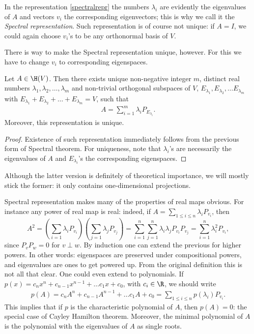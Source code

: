 In the representation \ref{spectralrepr} the numbers $\lambda_{i}$ are evidently the eigenvalues of $A$ and vectors $v_{i}$ the corresponding eigenvectors; this is why we call it the \textit{Spectral representation}. Such representation is of course not unique: if $A = I$, we could again choose $v_{i}$'s to be any orthonormal basis of $V$.

There is way to make the Spectral representation unique, however. For this we have to change $v_{i}$ to corresponding eigenspaces.

\begin{lause}
	Let $A \in \H(V)$. Then there exists unique non-negative integer $m$, distinct real numbers $\lambda_{1}, \lambda_{2}, \ldots, \lambda_{m}$ and non-trivial orthogonal subspaces of $V$, $E_{\lambda_{1}}, E_{\lambda_{2}}, \ldots E_{\lambda_{m}}$ with $E_{\lambda_{1}} + E_{\lambda_{2}} + \ldots + E_{\lambda_{m}} = V$, such that
	\begin{align*}\label{spectralrepr2}
		A = \sum_{i = 1}^{m} \lambda_{i} P_{E_{\lambda_{i}}}.
	\end{align*}
	Moreover, this representation is unique.
\end{lause}
\begin{proof}
	Existence of such representation immediately follows from the previous form of Spectral theorem. For uniqueness, note that $\lambda_{i}$'s are necessarily the eigenvalues of $A$ and $E_{\lambda_{i}}$'s the corresponding eigenspaces.
\end{proof}

Although the latter version is definitely of theoretical importance, we will mostly stick the former: it only contains one-dimensional projections.

Spectral representation makes many of the properties of real maps obvious. For instance any power of real map is real: indeed, if $A = \sum_{1 \leq i \leq n} \lambda_{i} P_{v_{i}}$, then
\[
	A^{2} = \left(\sum_{i = 1} \lambda_{i} P_{v_{i}}\right) \left(\sum_{j = 1} \lambda_{j} P_{v_{j}}\right) = \sum_{i = 1}^{n} \sum_{j = 1}^{n}\lambda_{i} \lambda_{j} P_{v_{i}} P_{v_{j}} = \sum_{i = 1}^{n} \lambda_{i}^2 P_{v_{i}},
\]
since $P_{v} P_{w} = 0$ for $v \perp w$. By induction one can extend the previous for higher powers. In other words: eigenspaces are preserved under compositional powers, and eigenvalues are ones to get powered up. From the original definition this is not all that clear. One could even extend to polynomials. If $p(x) = c_{n} x^{n} + c_{n- 1} x^{n - 1} + \ldots c_{1} x + c_{0}$, with $c_{i} \in \R$, we should write
\begin{align}\label{polynomial_matrix_function}
	p(A) = c_{n} A^{n} + c_{n - 1} A^{n - 1} + \ldots c_{1} A + c_{0} = \sum_{1 \leq i \leq n} p(\lambda_{i}) P_{v_{i}}.
\end{align}
This implies that if $p$ is the characteristic polynomial of $A$, then $p(A) = 0$: the special case of Cayley Hamilton theorem. Moreover, the minimal polynomial of $A$ is the polynomial with the eigenvalues of $A$ as single roots.

